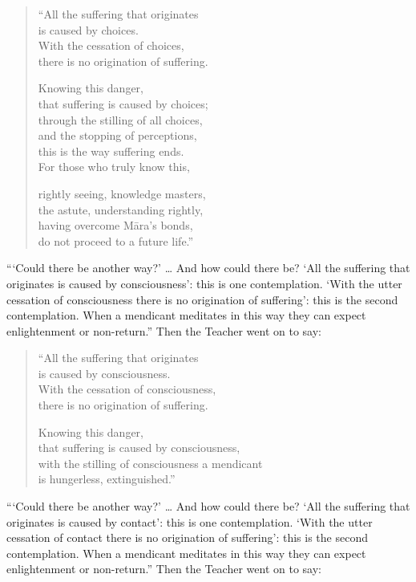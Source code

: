 \documentclass[12pt,openany]{book}%
\begin{document}
\begin{verse}%
“All the suffering that originates \\
is caused by choices. \\
With the cessation of choices, \\
there is no origination of suffering. 

Knowing this danger, \\
that suffering is caused by choices; \\
through the stilling of all choices, \\
and the stopping of perceptions, \\
this is the way suffering ends. \\
For those who truly know this, 

rightly seeing, knowledge masters, \\
the astute, understanding rightly, \\
having overcome \textsanskrit{Māra}’s bonds, \\
do not proceed to a future life.” 

%
\end{verse}

“‘Could there be another way?’ … And how could there be? ‘All the suffering that originates is caused by consciousness’: this is one contemplation. ‘With the utter cessation of consciousness there is no origination of suffering’: this is the second contemplation. When a mendicant meditates in this way they can expect enlightenment or non-return.” Then the Teacher went on to say: 

\begin{verse}%
“All the suffering that originates \\
is caused by consciousness. \\
With the cessation of consciousness, \\
there is no origination of suffering. 

Knowing this danger, \\
that suffering is caused by consciousness, \\
with the stilling of consciousness a mendicant \\
is hungerless, extinguished.” 

%
\end{verse}

“‘Could there be another way?’ … And how could there be? ‘All the suffering that originates is caused by contact’: this is one contemplation. ‘With the utter cessation of contact there is no origination of suffering’: this is the second contemplation. When a mendicant meditates in this way they can expect enlightenment or non-return.” Then the Teacher went on to say: 
\end{document}

